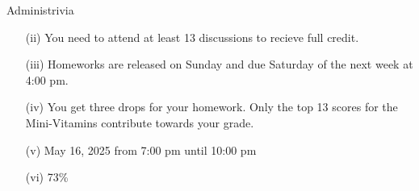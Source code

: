 \begin{homeworkProblem}{Administrivia}
\begin{itemize}
\begin{itemize}
\begin{multicols}{2}
                        \columnbreak %
                        
                        
                        \begin{itemize}
                            \item Discussion attendance: 5\%
                            \item Mini-Vitamins: 5\% (top 13 scores)
                            \item Midterm: 36\%
                            \item Final: 54\%
                        \end{itemize}
                    \end{multicols}
                    
                    
                \item[(ii)] You need to attend at least 13 discussions to recieve full credit.
                \item[(iii)] Homeworks are released on Sunday and due Saturday of the next week at 4:00 pm.
                \item[(iv)] You get three drops for your homework. Only the top 13 scores for the Mini-Vitamins contribute towards your grade.
                \item[(v)] May 16, 2025 from 7:00 pm until 10:00 pm
                \item[(vi)] 73\%
            \end{itemize}
    \end{itemize}

\end{homeworkProblem}